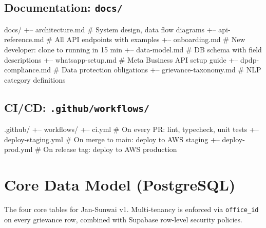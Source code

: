 \documentclass[12pt, a4paper]{article}
\begin{document}
\subsection{Documentation: \texttt{docs/}}

\begin{treebox}
docs/
+-- architecture.md                 # System design, data flow diagrams
+-- api-reference.md                # All API endpoints with examples
+-- onboarding.md                   # New developer: clone to running in 15 min
+-- data-model.md                   # DB schema with field descriptions
+-- whatsapp-setup.md               # Meta Business API setup guide
+-- dpdp-compliance.md              # Data protection obligations
+-- grievance-taxonomy.md           # NLP category definitions
\end{treebox}

\subsection{CI/CD: \texttt{.github/workflows/}}

\begin{treebox}
.github/
+-- workflows/
    +-- ci.yml                      # On every PR: lint, typecheck, unit tests
    +-- deploy-staging.yml          # On merge to main: deploy to AWS staging
    +-- deploy-prod.yml             # On release tag: deploy to AWS production
\end{treebox}

\newpage

\section{Core Data Model (PostgreSQL)}

The four core tables for Jan-Sunwai v1. Multi-tenancy is enforced via \texttt{office\_id} on every grievance row, combined with Supabase row-level security policies.
\end{document}
